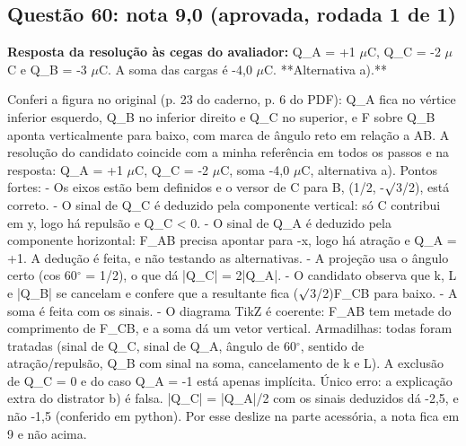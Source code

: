 \documentclass{article}%
\begin{document}
\subsection*{Questão 60: nota 9,0 (aprovada, rodada 1 de 1)}%
\textbf{Resposta da resolução às cegas do avaliador:} Q\_A = +1 $\mu$C, Q\_C = -2 $\mu$C e Q\_B = -3 $\mu$C. A soma das cargas é -4,0 $\mu$C. **Alternativa a).**\par %
Conferi a figura no original (p. 23 do caderno, p. 6 do PDF): Q\_A fica no vértice inferior esquerdo, Q\_B no inferior direito e Q\_C no superior, e F sobre Q\_B aponta verticalmente para baixo, com marca de ângulo reto em relação a AB. A resolução do candidato coincide com a minha referência em todos os passos e na resposta: Q\_A = +1 $\mu$C, Q\_C = -2 $\mu$C, soma -4,0 $\mu$C, alternativa a).\newline%
\newline%
Pontos fortes:\newline%
{-} Os eixos estão bem definidos e o versor de C para B, (1/2, -$\surd$3/2), está correto.\newline%
{-} O sinal de Q\_C é deduzido pela componente vertical: só C contribui em y, logo há repulsão e Q\_C < 0.\newline%
{-} O sinal de Q\_A é deduzido pela componente horizontal: F\_AB precisa apontar para -x, logo há atração e Q\_A = +1. A dedução é feita, e não testando as alternativas.\newline%
{-} A projeção usa o ângulo certo (cos 60$^\circ$ = 1/2), o que dá |Q\_C| = 2|Q\_A|.\newline%
{-} O candidato observa que k, L e |Q\_B| se cancelam e confere que a resultante fica ($\surd$3/2)F\_CB para baixo.\newline%
{-} A soma é feita com os sinais.\newline%
{-} O diagrama TikZ é coerente: F\_AB tem metade do comprimento de F\_CB, e a soma dá um vetor vertical.\newline%
\newline%
Armadilhas: todas foram tratadas (sinal de Q\_C, sinal de Q\_A, ângulo de 60$^\circ$, sentido de atração/repulsão, Q\_B com sinal na soma, cancelamento de k e L). A exclusão de Q\_C = 0 e do caso Q\_A = -1 está apenas implícita.\newline%
\newline%
Único erro: a explicação extra do distrator b) é falsa. |Q\_C| = |Q\_A|/2 com os sinais deduzidos dá -2,5, e não -1,5 (conferido em python). Por esse deslize na parte acessória, a nota fica em 9 e não acima.%
\end{document}
